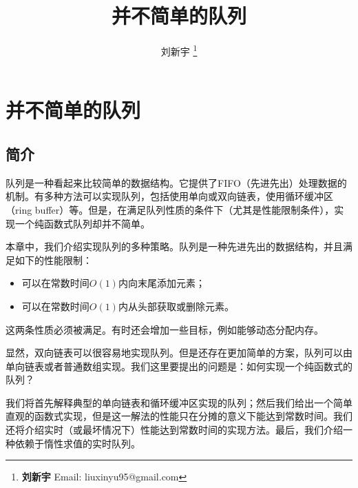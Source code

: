\documentclass[UTF8]{article}
\begin{document}


\title{并不简单的队列}

\author{刘新宇
\thanks{{\bfseries 刘新宇 } \newline
  Email: liuxinyu95@gmail.com \newline}
  }

\maketitle
\fi


\ifx\wholebook\relax
\chapter{并不简单的队列}
\fi

\section{简介}
\label{introduction}

队列是一种看起来比较简单的数据结构。它提供了FIFO（先进先出）处理数据的机制。有多种方法可以实现队列，包括使用单向或双向链表，使用循环缓冲区（ring buffer）等。但是，在满足队列性质的条件下（尤其是性能限制条件），实现一个纯函数式队列却并不简单。

本章中，我们介绍实现队列的多种策略。队列是一种先进先出的数据结构，并且满足如下的性能限制：

\begin{itemize}
\item 可以在常数时间$O(1)$内向末尾添加元素；
\item 可以在常数时间$O(1)$内从头部获取或删除元素。
\end{itemize}

这两条性质必须被满足。有时还会增加一些目标，例如能够动态分配内存。

显然，双向链表可以很容易地实现队列。但是还存在更加简单的方案，队列可以由单向链表或者普通数组实现。我们这里要提出的问题是：如何实现一个纯函数式的队列？

我们将首先解释典型的单向链表和循环缓冲区实现的队列；然后我们给出一个简单直观的函数式实现，但是这一解法的性能只在分摊的意义下能达到常数时间。我们还将介绍实时（或最坏情况下）性能达到常数时间的实现方法。最后，我们介绍一种依赖于惰性求值的实时队列。
\end{document}
